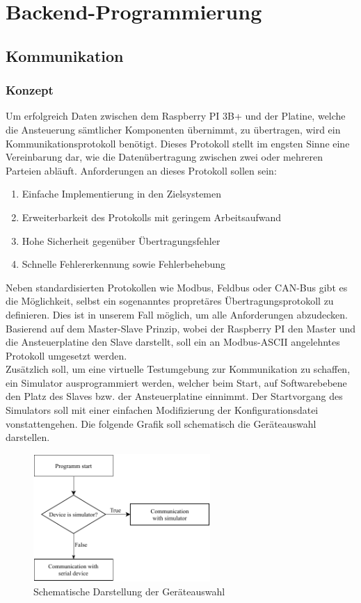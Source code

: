\section{Backend-Programmierung}\label{sec:backend-programmierung}
\subsection{Kommunikation}\label{subsec:kommunikation}
\subsubsection{Konzept}
Um erfolgreich Daten zwischen dem Raspberry PI 3B+ und der Platine, welche die Ansteuerung sämtlicher Komponenten übernimmt, zu übertragen, wird ein Kommunikationsprotokoll benötigt.
Dieses Protokoll stellt im engsten Sinne eine Vereinbarung dar, wie die Datenübertragung zwischen zwei oder mehreren Parteien abläuft.
Anforderungen an dieses Protokoll sollen sein:
\begin{enumerate}
    \item Einfache Implementierung in den Zielsystemen
    \item Erweiterbarkeit des Protokolls mit geringem Arbeitsaufwand
    \item Hohe Sicherheit gegenüber Übertragungsfehler
    \item Schnelle Fehlererkennung sowie Fehlerbehebung
\end{enumerate}
Neben standardisierten Protokollen wie Modbus, Feldbus oder CAN-Bus gibt es die Möglichkeit, selbst ein sogenanntes propretäres Übertragungsprotokoll zu definieren.
Dies ist in unserem Fall möglich, um alle Anforderungen abzudecken.
Basierend auf dem Master-Slave Prinzip, wobei der Raspberry PI den Master und die Ansteuerplatine den Slave darstellt, soll ein an Modbus-ASCII angelehntes Protokoll umgesetzt werden.\\
Zusätzlich soll, um eine virtuelle Testumgebung zur Kommunikation zu schaffen, ein Simulator ausprogrammiert werden, welcher beim Start, auf Softwarebebene den Platz des Slaves bzw. der Ansteuerplatine einnimmt.
Der Startvorgang des Simulators soll mit einer einfachen Modifizierung der Konfigurationsdatei vonstattengehen.
Die folgende Grafik soll schematisch die Geräteauswahl darstellen.
\begin{figure}[H]
    \centering
    \includegraphics[width=0.6\textwidth]{fig/ainf/DeviceSelection}
    \caption{Schematische Darstellung der Geräteauswahl}
    \label{deviceSelection}
\end{figure}
